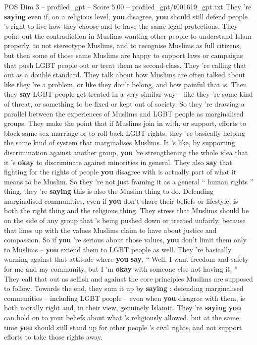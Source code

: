 \begin{textsample}{POS Dim 3 – profiled\_gpt – Score 5.00 – profiled\_gpt/t001619\_gpt.txt}
They ’re \textbf{saying} even if, on a religious level, \textbf{you} disagree, \textbf{you} should still defend people ’s right to live how they choose and to have the same legal protections.
They point out the contradiction in Muslims wanting other people to understand Islam properly, to not stereotype Muslims, and to recognise Muslims as full citizens, but then some of those same Muslims are happy to support laws or campaigns that push LGBT people out or treat them as second-class.
They ’re calling that out as a double standard.
They talk about how Muslims are often talked about like they ’re a problem, or like they don't belong, and how painful that is.
Then they \textbf{say} LGBT people get treated in a very similar way – like they ’re some kind of threat, or something to be fixed or kept out of society.
So they ’re drawing a parallel between the experiences of Muslims and LGBT people as marginalised groups.
They make the point that if Muslims join in with, or support, efforts to block same-sex marriage or to roll back LGBT rights, they ’re basically helping the same kind of system that marginalises Muslims.
It ’s like, by supporting discrimination against another group, \textbf{you} ’re strengthening the whole idea that it ’s \textbf{okay} to discriminate against minorities in general.
They also \textbf{say} that fighting for the rights of people \textbf{you} disagree with is actually part of what it means to be Muslim.
So they ’re not just framing it as a general “ human rights ” thing, they ’re \textbf{saying} this is also the Muslim thing to do.
Defending marginalised communities, even if \textbf{you} don't share their beliefs or lifestyle, is both the right thing and the religious thing.
They stress that Muslims should be on the side of any group that ’s being pushed down or treated unfairly, because that lines up with the values Muslims claim to have about justice and compassion.
So if \textbf{you} ’re serious about those values, \textbf{you} don't limit them only to Muslims – \textbf{you} extend them to LGBT people as well.
They ’re basically warning against that attitude where \textbf{you} \textbf{say}, “ Well, I want freedom and safety for me and my community, but I ’m \textbf{okay} with someone else not having it. ” They call that out as selfish and against the core principles Muslims are supposed to follow.
Towards the end, they sum it up by \textbf{saying} : defending marginalised communities – including LGBT people – even when \textbf{you} disagree with them, is both morally right and, in their view, genuinely Islamic.
They ’re \textbf{saying} \textbf{you} can hold on to your beliefs about what ’s religiously allowed, but at the same time \textbf{you} should still stand up for other people ’s civil rights, and not support efforts to take those rights away.

\end{textsample}
